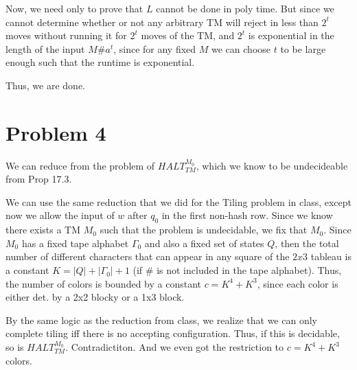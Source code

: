\documentclass{article}
\begin{document}
Now, we need only to prove that $L$ cannot be done in poly time. But since we cannot determine whether or not any arbitrary TM will reject in less than $2^t$ moves without running it for $2^t$ moves of the TM, and $2^t$ is exponential in the length of the input $M\#a^t$, since for any fixed $M$ we can choose $t$ to be large enough such that the runtime is exponential. 

Thus, we are done. 


\section*{Problem 4}
We can reduce from the problem of $HALT_{TM}^{M_0}$, which we know to be undecideable from Prop 17.3.

We can use the same reduction that we did for the Tiling problem in class, except now we allow the input of $w$ after $q_0$ in the first non-hash row. Since we know there exists a TM $M_0$ such that the problem is undecidable, we fix that $M_0$. Since $M_0$ has a fixed tape alphabet $\Gamma_0$ and also a fixed set of states $Q$, then the total number of different characters that can appear in any square of the $2x3$ tableau is a constant $K = |Q| + |\Gamma_0|+1$ (if $\#$ is not included in the tape alphabet). Thus, the number of colors is bounded by a constant $c = K^4+K^3$, since each color is either det. by a 2x2 blocky or a 1x3 block. 

By the same logic as the reduction from class, we realize that we can only complete tiling iff there is no accepting configuration. Thus, if this is decidable, so is $HALT_{TM}^{M_0}$. Contradictiton. And we even got the restriction to $c = K^4+K^3$ colors.  
\end{document}
